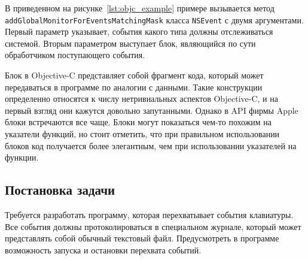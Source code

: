 В приведенном на рисунке~\ref{lst:objc_example} примере вызывается метод
\texttt{addGlobalMonitorForEventsMatchingMask} класса \texttt{NSEvent}
с двумя аргументами. Первый параметр указывает, события какого типа должны
отслеживаться системой. Вторым параметром выступает блок, являющийся по сути
обработчиком поступающего события.

Блок в Objective-C представляет собой фрагмент кода, который может
передаваться в программе по аналогии с данными. Такие конструкции определенно
относятся к числу нетривиальных аспектов Objective-C, и на первый взгляд они
кажутся довольно запутанными. Однако в API фирмы Apple блоки встречаются все
чаще. Блоки могут показаться чем-то похожим на указатели функций,
но стоит отметить, что при правильном использовании блоков код получается
более элегантным, чем при использовании указателей на функции.

\subsection{Постановка задачи}

Требуется разработать программу, которая перехватывает события клавиатуры.
Все события должны протоколироваться в специальном журнале, который может
представлять собой обычный текстовый файл. Предусмотреть в программе возможность
запуска и остановки перехвата событий.

\pagebreak

